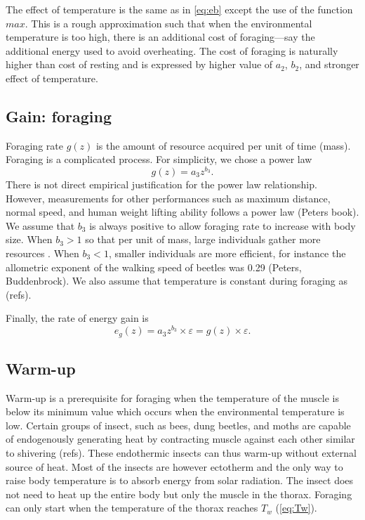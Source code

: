 The effect of temperature is the same as in \cref{eq:eb} except the use of the function $max$.
This is a rough approximation such that when the environmental temperature is too high, there is an additional cost of foraging---say the additional energy used to avoid overheating. 
The cost of foraging is naturally higher than cost of resting and is expressed by higher value of $a_2$, $b_2$, and stronger effect of temperature.

\subsection*{Gain: foraging}
Foraging rate $g(z)$ is the amount of resource acquired per unit of time (mass).
Foraging is a complicated process.
For simplicity, we chose a power law 
\[
	g(z) = a_3 z^{b_3}.
\] 
There is not direct empirical justification for the power law relationship.
However, measurements for other performances such as maximum distance, normal speed, and human weight lifting ability follows a power law (Peters book). 
We assume that $b_3$ is always positive to allow foraging rate to increase with body size.
When $b_3 > 1$ so that per unit of mass, large individuals gather more resources \citep[e.g.,][]{Nervo2014}.
When $b_3 < 1$, smaller individuals are more efficient, for instance the allometric exponent of the walking speed of beetles was 0.29 (Peters, Buddenbrock). 
We also assume that temperature is constant during foraging as (refs).

Finally, the rate of energy gain is  
\begin{equation} \label{eq:eg}
	e_g(z) = a_3 z^{b_3} \times \varepsilon  = g(z) \times \varepsilon.
\end{equation}

\subsection*{Warm-up}
Warm-up is a prerequisite for foraging when the temperature of the muscle is below its minimum value which occurs when the environmental temperature is low. 
Certain groups of insect, such as bees, dung beetles, and moths are capable of endogenously generating heat by contracting muscle against each other similar to shivering (refs).
These endothermic insects can thus warm-up without external source of heat. 
Most of the insects are however ectotherm and the only way to raise body temperature is to absorb energy from solar radiation.
The insect does not need to heat up the entire body but only the muscle in the thorax.
Foraging can only start when the temperature of the thorax reaches $T_w$ (\cref{eq:Tw}).

